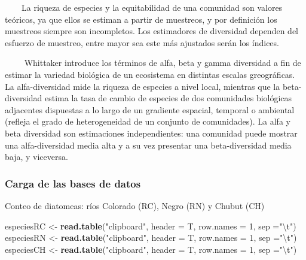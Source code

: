 \documentclass[
]{article}
\newenvironment{Shaded}{\begin{snugshade}}{\end{snugshade}}
\newcommand{\CharTok}[1]{\textcolor[rgb]{0.31,0.60,0.02}{#1}}
\newcommand{\DataTypeTok}[1]{\textcolor[rgb]{0.13,0.29,0.53}{#1}}
\newcommand{\DecValTok}[1]{\textcolor[rgb]{0.00,0.00,0.81}{#1}}
\newcommand{\KeywordTok}[1]{\textcolor[rgb]{0.13,0.29,0.53}{\textbf{#1}}}
\newcommand{\NormalTok}[1]{#1}
\newcommand{\StringTok}[1]{\textcolor[rgb]{0.31,0.60,0.02}{#1}}
\begin{document}
~~~~La riqueza de especies y la equitabilidad de una comunidad son
valores teóricos, ya que ellos se estiman a partir de muestreos, y por
definición los muestreos siempre son incompletos. Los estimadores de
diversidad dependen del esfuerzo de muestreo, entre mayor sea este más
ajustados serán los índices.

~~~~ Whittaker introduce los términos de alfa, beta y gamma diversidad a
fin de estimar la variedad biológica de un ecosistema en distintas
escalas greográficas. La alfa-diversidad mide la riqueza de especies a
nivel local, mientras que la beta-diversidad estima la tasa de cambio de
especies de dos comunidades biológicas adjacentes dispuestas a lo largo
de un gradiente espacial, temporal o ambiental (refleja el grado de
heterogeneidad de un conjunto de comunidades). La alfa y beta diversidad
son estimaciones independientes: una comunidad puede mostrar una
alfa-diversidad media alta y a su vez presentar una beta-diversidad
media baja, y viceversa.

\hypertarget{carga-de-las-bases-de-datos}{%
\subsubsection{Carga de las bases de
datos}\label{carga-de-las-bases-de-datos}}

Conteo de diatomeas: ríos Colorado (RC), Negro (RN) y Chubut (CH)

\begin{Shaded}
\begin{Highlighting}[]
\NormalTok{especiesRC <-}\StringTok{ }\KeywordTok{read.table}\NormalTok{(}\StringTok{"clipboard"}\NormalTok{, }\DataTypeTok{header =}\NormalTok{ T, }\DataTypeTok{row.names =} \DecValTok{1}\NormalTok{, }\DataTypeTok{sep =}\StringTok{"}\CharTok{\textbackslash{}t}\StringTok{"}\NormalTok{)}
\NormalTok{especiesRN <-}\StringTok{ }\KeywordTok{read.table}\NormalTok{(}\StringTok{"clipboard"}\NormalTok{, }\DataTypeTok{header =}\NormalTok{ T, }\DataTypeTok{row.names =} \DecValTok{1}\NormalTok{, }\DataTypeTok{sep =}\StringTok{"}\CharTok{\textbackslash{}t}\StringTok{"}\NormalTok{)}
\NormalTok{especiesCH <-}\StringTok{ }\KeywordTok{read.table}\NormalTok{(}\StringTok{"clipboard"}\NormalTok{, }\DataTypeTok{header =}\NormalTok{ T, }\DataTypeTok{row.names =} \DecValTok{1}\NormalTok{, }\DataTypeTok{sep =}\StringTok{"}\CharTok{\textbackslash{}t}\StringTok{"}\NormalTok{)}
\end{Highlighting}
\end{Shaded}
\end{document}
